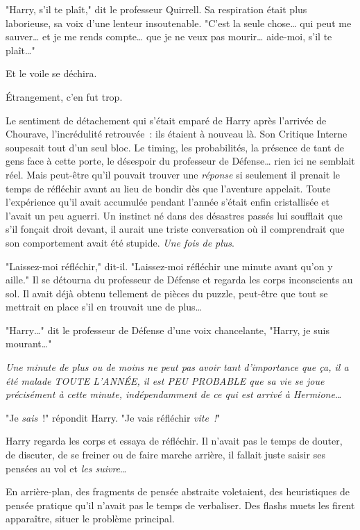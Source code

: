 "Harry, s'il te plaît," dit le professeur Quirrell. Sa respiration était plus laborieuse, sa voix d'une lenteur insoutenable. "C'est la seule chose… qui peut me sauver… et je me rends compte… que je ne veux pas mourir… aide-moi, s'il te plaît…"

Et le voile se déchira.

Étrangement, c'en fut trop.

Le sentiment de détachement qui s'était emparé de Harry après l'arrivée de Chourave, l'incrédulité retrouvée~: ils étaient à nouveau là. Son Critique Interne soupesait tout d'un seul bloc. Le timing, les probabilités, la présence de tant de gens face à cette porte, le désespoir du professeur de Défense… rien ici ne semblait réel. Mais peut-être qu'il pouvait trouver une \emph{réponse} si seulement il prenait le temps de réfléchir avant au lieu de bondir dès que l'aventure appelait. Toute l'expérience qu'il avait accumulée pendant l'année s'était enfin cristallisée et l'avait un peu aguerri. Un instinct né dans des désastres passés lui soufflait que s'il fonçait droit devant, il aurait une triste conversation où il comprendrait que son comportement avait été stupide. \emph{Une fois de plus}.

"Laissez-moi réfléchir," dit-il. "Laissez-moi réfléchir une minute avant qu'on y aille." Il se détourna du professeur de Défense et regarda les corps inconscients au sol. Il avait déjà obtenu tellement de pièces du puzzle, peut-être que tout se mettrait en place s'il en trouvait une de plus…

"Harry…" dit le professeur de Défense d'une voix chancelante, "Harry, je suis mourant…"

\emph{Une minute de plus ou de moins ne peut pas avoir tant d'importance que ça, il a été malade TOUTE L'ANNÉE, il est PEU PROBABLE que sa vie se joue précisément à cette minute, indépendamment de ce qui est arrivé à Hermione…}

"Je \emph{sais}~!" répondit Harry. "Je vais réfléchir \emph{vite~!}"

Harry regarda les corps et essaya de réfléchir. Il n'avait pas le temps de douter, de discuter, de se freiner ou de faire marche arrière, il fallait juste saisir ses pensées au vol et \emph{les suivre}…

En arrière-plan, des fragments de pensée abstraite voletaient, des heuristiques de pensée pratique qu'il n'avait pas le temps de verbaliser. Des flashs muets les firent apparaître, situer le problème principal.

